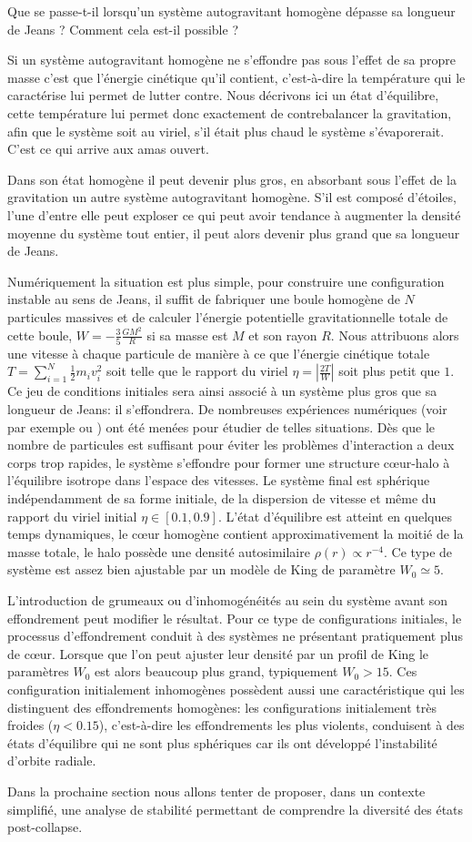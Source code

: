 Que se passe-t-il lorsqu'un système autogravitant homogène dépasse sa longueur de Jeans ?
Comment cela est-il possible ?

Si un système autogravitant homogène ne s'effondre pas sous l'effet de sa propre masse c'est que l'énergie cinétique qu'il contient, c'est-à-dire la
température qui le caractérise lui permet de lutter contre. Nous décrivons ici un état d'équilibre, cette température lui permet
donc exactement de contrebalancer la gravitation, afin que le système soit \og au viriel\fg, s'il était plus chaud le système s'évaporerait.
C'est ce qui arrive aux amas ouvert.

Dans son état homogène il peut devenir plus gros, en absorbant sous l'effet de la gravitation un autre système autogravitant homogène. S'il est
composé d'étoiles, l'une d'entre elle peut exploser ce qui peut avoir tendance à augmenter la densité moyenne du système tout entier, il peut alors
devenir plus grand que sa longueur de Jeans.

Numériquement la situation est plus simple, pour construire une configuration instable au sens de Jeans, il suffit de fabriquer une boule homogène de
$N$ particules massives et de calculer l'énergie potentielle gravitationnelle totale de cette boule, $W=-\frac{3}{5}\frac{GM^2}{R}$ si sa masse est
$M$ et son rayon $R$. Nous attribuons alors une vitesse à chaque particule de manière à ce que l'énergie cinétique totale $T=\sum_{i=1}^N\frac{1}{2}m_i
v_i^2$ soit telle que le rapport du viriel $\eta=\left|\frac{2T}{W}\right|$ soit plus petit que $1$. Ce jeu de conditions initiales sera ainsi associé
à un système plus gros que sa longueur de Jeans: il s'effondrera. De nombreuses expériences numériques (voir par exemple \cite{roy} ou
\cite{Joyceetal}) ont été menées pour étudier de telles situations. Dès que le nombre de particules est suffisant pour
éviter les problèmes d'interaction a deux corps trop rapides, le système s'effondre pour former une structure cœur-halo à l'équilibre isotrope dans
l'espace des vitesses. Le système final est sphérique indépendamment de sa forme initiale, de la dispersion de vitesse et même du rapport du viriel
initial $\eta\in[0.1, 0.9]$. L'état d'équilibre est atteint en quelques temps dynamiques, le cœur homogène contient approximativement la moitié de la
masse totale, le halo possède une densité autosimilaire $\rho(r)\propto r^{-4}$. Ce type de système est assez bien ajustable par un modèle de King de
paramètre $W_0\simeq 5$.

L'introduction de grumeaux ou d'inhomogénéités au sein du système avant son effondrement peut modifier le résultat. Pour ce type de configurations
initiales, le processus d'effondrement conduit à des systèmes ne présentant pratiquement plus de cœur. Lorsque que l'on peut ajuster leur densité
par un profil de King le paramètres $W_0$ est alors beaucoup plus grand, typiquement  $W_0>15$. Ces configuration initialement inhomogènes possèdent
aussi une caractéristique qui les distinguent des effondrements homogènes: les configurations initialement très froides ($\eta<0.15$), c'est-à-dire
les effondrements les plus violents, conduisent à des états d'équilibre qui ne sont plus sphériques car ils ont développé l'instabilité d'orbite
radiale.


Dans la prochaine section nous allons tenter de proposer, dans un contexte simplifié, une analyse de stabilité permettant de comprendre la diversité
des états post-collapse.

